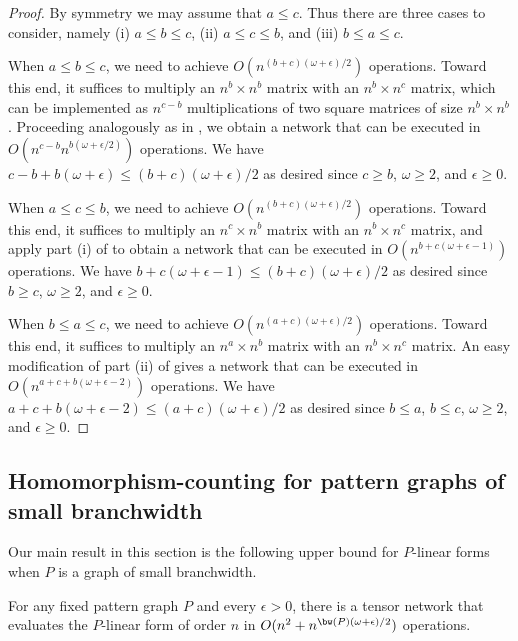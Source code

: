 \begin{proof}
By symmetry we may assume that $a\leq c$. Thus there are three cases
to consider, namely (i) $a\leq b\leq c$, (ii) $a\leq c\leq b$, and
(iii) $b\leq a\leq c$.

When $a\leq b\leq c$, we need to achieve $O(n^{(b+c)(\omega+\epsilon)/2})$
operations. Toward this end, it suffices to multiply an $n^b\times n^b$ matrix
with an $n^b\times n^c$ matrix, which can be implemented as $n^{c-b}$
multiplications of two square matrices of size $n^b\times n^b$.
Proceeding analogously as in , we obtain a network that
can be executed in $O(n^{c-b}n^{b(\omega+\epsilon/2)})$ operations.
We have $c-b+b(\omega+\epsilon)\leq (b+c)(\omega+\epsilon)/2$ as desired
since $c\geq b$, $\omega\geq 2$, and $\epsilon\geq 0$.

When $a\leq c\leq b$, we need to achieve $O(n^{(b+c)(\omega+\epsilon)/2})$
operations. Toward this end, it suffices to multiply an $n^c\times n^b$ matrix
with an $n^b\times n^c$ matrix, and apply part (i) of  to obtain
a network that can be executed in $O(n^{b+c(\omega+\epsilon-1)})$ operations.
We have $b+c(\omega+\epsilon-1)\leq (b+c)(\omega+\epsilon)/2$ as desired
since $b\geq c$, $\omega\geq 2$, and $\epsilon\geq 0$.

When $b\leq a\leq c$, we need to achieve $O(n^{(a+c)(\omega+\epsilon)/2})$
operations. Toward this end, it suffices to multiply an $n^a\times n^b$ matrix
with an $n^b\times n^c$ matrix. An easy modification of part (ii) of
 gives a network that can be executed in
$O(n^{a+c+b(\omega+\epsilon-2)})$ operations.
We have $a+c+b(\omega+\epsilon-2)\leq (a+c)(\omega+\epsilon)/2$ as desired
since $b\leq a$, $b\leq c$, $\omega\geq 2$, and $\epsilon\geq 0$.
\end{proof}


\subsection{Homomorphism-counting for pattern graphs of small branchwidth}

Our main result in this section is the following upper bound for $P$-linear forms when $P$ is a graph
of small branchwidth.

\begin{lemma}
  \label{lem:branchwidth ub}
  For any fixed pattern graph $P$ and every $\epsilon > 0$, there is a tensor network that evaluates the $P$-linear form of order $n$
  in $O(n^2 + n^{\bw(P) (\omega + \epsilon) / 2})$ operations.
\end{lemma}


